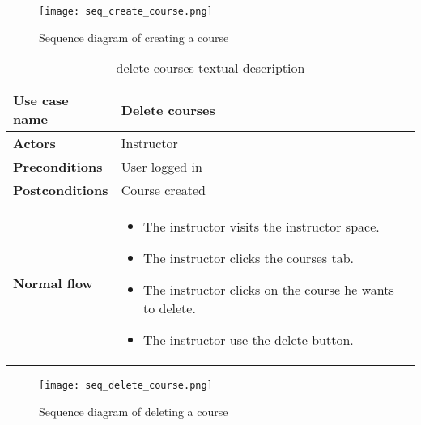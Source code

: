 \begin{figure}[!ht]
    \centering
    \texttt{[image: seq\_create\_course.png]}
    \caption{Sequence diagram of creating a course}
    \label{fig:seq_create_course}
\end{figure}


\begin{table}[H]
\centering
\caption{delete courses textual description}
\begin{tabular}{|p{4cm}|p{10cm}|}
\hline
\textbf{\large{Use case name}} & Delete courses \\\hline
\textbf{\large{Actors}} & Instructor \\\hline
\textbf{\large{Preconditions}} & User logged in \\\hline
\textbf{\large{Postconditions}} & Course created  \\\hline
\textbf{\large{Normal flow}} & 
\begin{itemize}
  \item The instructor visits the instructor space.
  \item The instructor clicks the courses tab.
  \item The instructor clicks on the course he wants to delete.
  \item The instructor use the delete button.
\end{itemize}
\\\hline

\end{tabular}
\end{table}

\begin{figure}[!ht]
    \centering
    \texttt{[image: seq\_delete\_course.png]}
    \caption{Sequence diagram of deleting a course}
    \label{fig:seq_delete_course}
\end{figure}

\newpage
\vfill

